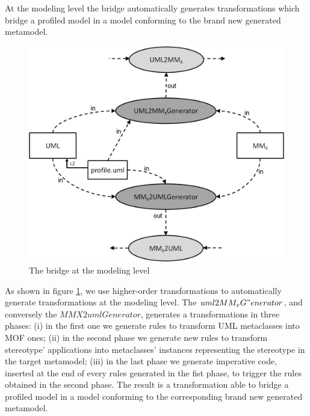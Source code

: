 At the modeling level the bridge automatically generates transformations which bridge a profiled model in a model conforming to the brand new generated metamodel.
\begin{figure}[htbp]
	\centering
		\includegraphics[width=1.00\textwidth]{figures/modelingLevel.png}
	\caption{The bridge at the modeling level}
	\label{fig:modelingLevel}
\end{figure}

As shown in figure \ref{fig:modelingLevel}, we use higher-order transformations to automatically generate transformations at the modeling level. The $uml2MM_xG"enerator$, and conversely the $MMX2umlGenerator$, generates a transformations in three phases: (i) in the first one we generate rules to transform UML metaclasses into MOF ones; (ii) in the second phase we generate new rules to transform stereotype' applications into metaclasses' instances representing the stereotype in the target metamodel; (iii) in the last phase we generate imperative code, inserted at the end of every rules generated in the fist phase, to trigger the rules obtained in the second phase. The result is a transformation able to bridge a profiled model in a model conforming to the corresponding brand new generated metamodel.

